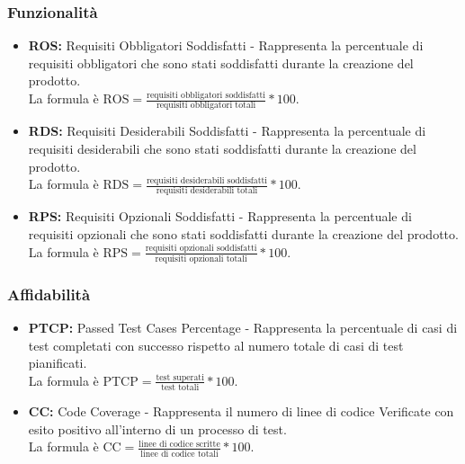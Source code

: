 \subsubsection{Funzionalità}
\begin{itemize}
    \item \textbf{ROS:} Requisiti Obbligatori Soddisfatti - Rappresenta la percentuale di requisiti obbligatori che sono stati soddisfatti durante la creazione del prodotto.\\
    La formula è \( \text{ROS} = \frac{\text{requisiti obbligatori soddisfatti}}{\text{requisiti obbligatori totali}}*100 \).
    \item \textbf{RDS:} Requisiti Desiderabili Soddisfatti - Rappresenta la percentuale di requisiti desiderabili che sono stati soddisfatti durante la creazione del prodotto.\\
    La formula è \( \text{RDS} = \frac{\text{requisiti desiderabili soddisfatti}}{\text{requisiti desiderabili totali}}*100 \).
    \item \textbf{RPS:} Requisiti Opzionali Soddisfatti - Rappresenta la percentuale di requisiti opzionali che sono stati soddisfatti durante la creazione del prodotto.\\
    La formula è \( \text{RPS} = \frac{\text{requisiti opzionali soddisfatti}}{\text{requisiti opzionali totali}}*100 \).
\end{itemize}

\subsubsection{Affidabilità}
\begin{itemize}
    \item \textbf{PTCP:} Passed Test Cases Percentage - Rappresenta la percentuale di casi di test completati con successo rispetto al numero totale di casi di test pianificati.\\
    La formula è \( \text{PTCP} = \frac{\text{test superati}}{\text{test totali}}*100 \).
    \item \textbf{CC:} Code Coverage - Rappresenta il numero di linee di codice Verificate con esito positivo all'interno di un processo di test.\\
    La formula è \( \text{CC} = \frac{\text{linee di codice scritte}}{\text{linee di codice totali}}*100 \).
\end{itemize}

